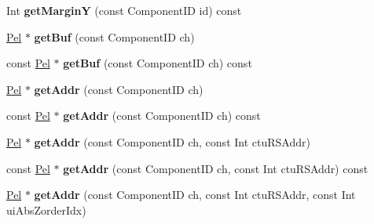 \begin{DoxyCompactItemize}
\mbox{\label{class_t_com_pic_yuv_a011d679677064b6a259023bb1e83110b}} 
Int {\bfseries get\+MarginY} (const Component\+ID id) const
\item 
\mbox{\label{class_t_com_pic_yuv_ae5452f6f2c80e3c1a0e48dc8f2e05e3c}} 
\hyperlink{_type_def_8h_af92141699657699b4b547be0c8517541}{Pel} $\ast$ {\bfseries get\+Buf} (const Component\+ID ch)
\item 
\mbox{\label{class_t_com_pic_yuv_ac805b8e112bd659e36062aabca9018e3}} 
const \hyperlink{_type_def_8h_af92141699657699b4b547be0c8517541}{Pel} $\ast$ {\bfseries get\+Buf} (const Component\+ID ch) const
\item 
\mbox{\label{class_t_com_pic_yuv_af7e15f9ae979ee4d82d40a1218977aa4}} 
\hyperlink{_type_def_8h_af92141699657699b4b547be0c8517541}{Pel} $\ast$ {\bfseries get\+Addr} (const Component\+ID ch)
\item 
\mbox{\label{class_t_com_pic_yuv_a91de0b338cfde787852f1d6eee531303}} 
const \hyperlink{_type_def_8h_af92141699657699b4b547be0c8517541}{Pel} $\ast$ {\bfseries get\+Addr} (const Component\+ID ch) const
\item 
\mbox{\label{class_t_com_pic_yuv_a895a7230a09f8c92b1af2178877f8768}} 
\hyperlink{_type_def_8h_af92141699657699b4b547be0c8517541}{Pel} $\ast$ {\bfseries get\+Addr} (const Component\+ID ch, const Int ctu\+R\+S\+Addr)
\item 
\mbox{\label{class_t_com_pic_yuv_a6fe0437b3f1de2e870409ffa0d0fdd7c}} 
const \hyperlink{_type_def_8h_af92141699657699b4b547be0c8517541}{Pel} $\ast$ {\bfseries get\+Addr} (const Component\+ID ch, const Int ctu\+R\+S\+Addr) const
\item 
\mbox{\label{class_t_com_pic_yuv_a281cca406d37c4a66b6c656868a451f0}} 
\hyperlink{_type_def_8h_af92141699657699b4b547be0c8517541}{Pel} $\ast$ {\bfseries get\+Addr} (const Component\+ID ch, const Int ctu\+R\+S\+Addr, const Int ui\+Abs\+Zorder\+Idx)
\item 
\mbox{\label{class_t_com_pic_yuv_af00fd365c942a9041b12522b1d33d717}} 

\end{DoxyCompactItemize}
